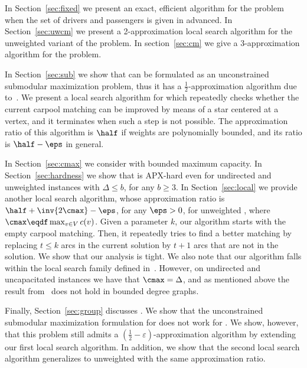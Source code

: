 In Section~\ref{sec:fixed} we present an exact, efficient algorithm for the
problem when the set of drivers and passengers is given in advanced.
In Section~\ref{sec:uwcm} we present a 2-approximation local search algorithm
for the unweighted variant of the problem.
In section~\ref{sec:cm} we give a 3-approximation algorithm for the problem.

In Section~\ref{sec:sub} we show that \carpool
can be formulated as an unconstrained submodular maximization problem,
thus it has a $\frac{1}{2}$-approximation algorithm due
to~\cite{BFNS15,buchbinder2016deterministic}.
%
We present a local search algorithm for \carpool which repeatedly
checks whether the current carpool matching can be improved by means
of a star centered at a vertex, and it terminates when such a step is
not possible.
%
The approximation ratio of this algorithm is $\half$ if weights are
polynomially bounded, and its ratio is $\half-\eps$ in general.

In Section~\ref{sec:cmax} we consider \carpool with boun\-ded maximum
capacity.   
%
In Section~\ref{sec:hardness} we show that \carpool is APX-hard even
for undirected and unweighted instances with $\Delta \leq b$, for any
$b \geq 3$.
%
In Section~\ref{sec:local} we provide another local search algorithm,
whose approximation ratio is $\half + \inv{2\cmax} - \eps$, for any
$\eps>0$, for unweighted \carpool, where $\cmax \eqdf \max_{v \in V}
c(v)$.  Given a parameter $k$, our algorithm starts with the empty
carpool matching.  Then, it repeatedly tries to find a better matching
by replacing $t \leq k$ arcs in the current solution by $t+1$ arcs
that are not in the solution.
%
We show that our analysis is tight.
%
We also note that our algorithm falls within the local search family
defined in~\cite{ACKK09}.  However, on undirected and uncapacitated
instances we have that $\cmax = \Delta$, and as mentioned above the
result from~\cite{ACKK09} does not hold in bounded degree graphs.

Finally, Section~\ref{sec:group} discusses \gcp.  We show that the
unconstrained submodular maximization formulation for \carpool does
not work for \gcp.  We show, however, that this problem still admits a
$(\frac{1}{2} -\varepsilon)$-approximation algorithm by extending our
first local search algorithm.  In addition, we show that the second
local search algorithm generalizes to unweighted \gcp with the same
approximation ratio.
